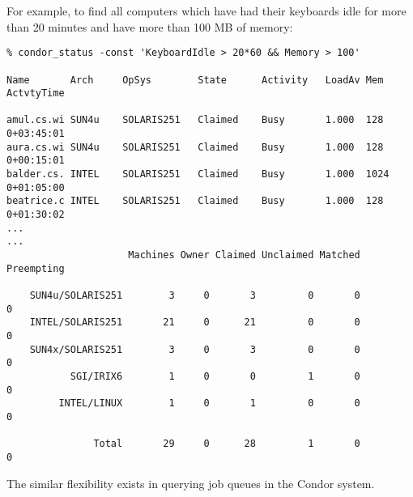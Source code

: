 For example, to find all computers which have had their keyboards idle for 
more than 20 minutes and have more than 100 MB of memory:
\begin{verbatim}
% condor_status -const 'KeyboardIdle > 20*60 && Memory > 100'

Name       Arch     OpSys        State      Activity   LoadAv Mem  ActvtyTime

amul.cs.wi SUN4u    SOLARIS251   Claimed    Busy       1.000  128   0+03:45:01
aura.cs.wi SUN4u    SOLARIS251   Claimed    Busy       1.000  128   0+00:15:01
balder.cs. INTEL    SOLARIS251   Claimed    Busy       1.000  1024  0+01:05:00
beatrice.c INTEL    SOLARIS251   Claimed    Busy       1.000  128   0+01:30:02
...
...
                     Machines Owner Claimed Unclaimed Matched Preempting

    SUN4u/SOLARIS251        3     0       3         0       0          0
    INTEL/SOLARIS251       21     0      21         0       0          0
    SUN4x/SOLARIS251        3     0       3         0       0          0
           SGI/IRIX6        1     0       0         1       0          0
         INTEL/LINUX        1     0       1         0       0          0

               Total       29     0      28         1       0          0
\end{verbatim}

The similar flexibility exists in querying job queues in the Condor system.

